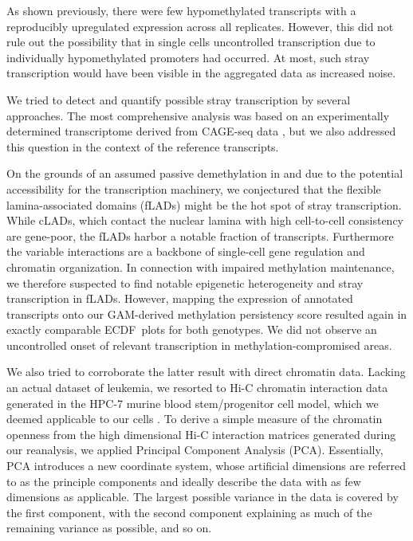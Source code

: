 As shown previously, there were few hypomethylated transcripts with a reproducibly upregulated expression across all replicates. However, this did not rule out the possibility that in single cells uncontrolled transcription due to individually hypomethylated promoters had occurred. At most, such stray transcription would have been visible in the aggregated data as increased noise. 

We tried to detect and quantify possible stray transcription by several approaches. The most comprehensive analysis was based on an experimentally determined transcriptome derived from CAGE-seq data , but we also addressed this question in the context of the reference transcripts. 

On the grounds of an assumed passive demethylation in \dnmtchip and due to the potential accessibility for the transcription machinery, we conjectured that the flexible lamina-associated domains (fLADs) might be the hot spot of stray transcription. While cLADs, which contact the nuclear lamina with high cell-to-cell consistency are gene-poor, the fLADs harbor a notable fraction of transcripts\cite{Guelen2008}. Furthermore the variable interactions are a backbone of single-cell gene regulation and chromatin organization\cite{Kind2015}. In connection with impaired methylation maintenance, we therefore suspected to find notable epigenetic heterogeneity and stray transcription in fLADs. However, mapping the expression of annotated transcripts onto our GAM-derived methylation persistency score resulted again in exactly comparable ECDF~plots for both genotypes. We did not observe an uncontrolled onset of relevant transcription in methylation-compromised areas.

We also tried to corroborate the latter result with direct chromatin data. Lacking an actual dataset of \mllafnine \kitpos leukemia, we resorted to Hi-C chromatin interaction data generated in the HPC-7 murine blood stem/progenitor cell model\cite{Wilson2016}, which we deemed applicable to our cells . To derive a simple measure of the chromatin openness from the high dimensional Hi-C interaction matrices generated during our reanalysis, we applied Principal Component Analysis (PCA). Essentially, PCA introduces a new coordinate system, whose artificial dimensions are referred to as the principle components and ideally describe the data with as few dimensions as applicable. The largest possible variance in the data is covered by the first component, with the second component explaining as much of the remaining variance as possible, and so on. 

